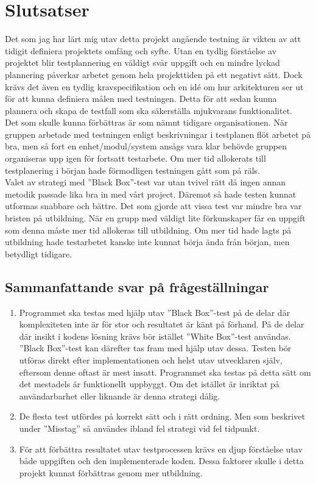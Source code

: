 \section{Slutsatser}
	Det som jag har lärt mig utav detta projekt angående testning är vikten av att tidigit definiera projektets omfång och syfte. Utan en tydlig förståelse av projektet blir testplannering en väldigt svår uppgift och en mindre lyckad plannering påverkar arbetet genom hela projekttiden på ett negativt sätt. Dock krävs det även en tydlig kravspecifikation och en idé om hur arkitekturen ser ut för att kunna definiera målen med testningen. Detta för att sedan kunna plannera och skapa de testfall som ska säkerställa mjukvarans funktionalitet. \\
Det som skulle kunna förbättras är som nämnt tidigare organisationen. När gruppen arbetade med testningen enligt beskrivningar i testplanen flöt arbetet på bra, men så fort en enhet/modul/system ansågs vara klar behövde gruppen organiseras upp igen för fortsatt testarbete. Om mer tid allokerats till testplanering i början hade förmodligen testningen gått som på räls. \\
Valet av strategi med ''Black Box''-test var utan tvivel rätt då ingen annan metodik passade lika bra in med vårt project. Däremot så hade testen kunnat utformas snabbare och bättre. Det som gjorde att vissa test var mindre bra var bristen på utbildning. När en grupp med väldigt lite förkunskaper får en uppgift som denna måste mer tid allokeras till utbildning. Om mer tid hade lagts på utbildning hade testarbetet kanske inte kunnat börja ända från början, men betydligt tidigare.
	
\subsection{Sammanfattande svar på frågeställningar}
	\begin{enumerate}
	\item Programmet ska testas med hjälp utav ''Black Box''-test på de delar där komplexiteten inte är för stor och resultatet är känt på förhand. På de delar där insikt i kodens lösning krävs bör istället ''White Box''-test användas. ''Black Box''-test kan därefter tas fram med hjälp utav dessa. Testen bör utföras direkt efter implementationen och helst utav utvecklaren själv, eftersom denne oftast är mest insatt. Programmet ska testas på detta sätt om det mestadels är funktionellt uppbyggt. Om det istället är inriktat på användarbarhet eller liknande är denna strategi dålig.
	\item De flesta test utfördes på korrekt sätt och i rätt ordning. Men som beskrivet under ''Misstag'' så användes ibland fel strategi vid fel tidpunkt.
	\item För att förbättra resultatet utav testprocessen krävs en djup förståelse utav både uppgiften och den implementerade koden. Dessa faktorer skulle i detta projekt kunnat förbättras genom mer utbildning.
	\end{enumerate}
	
